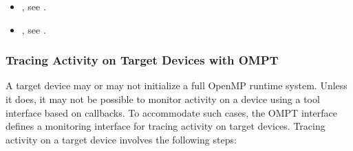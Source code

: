 \crossreferences
\begin{itemize}
\item {}, see .
\item {}, see .
\end{itemize}




\subsubsection{Tracing Activity on Target Devices with OMPT}
\label{sec:tracing-device-activity}

A target device may or may not initialize a full OpenMP runtime system.
Unless it does, it may not be possible to monitor activity
on a device using a tool interface based on callbacks.
To accommodate such cases, the OMPT interface defines
a monitoring interface for tracing activity on target
devices. Tracing activity on a target device involves the following
steps:

